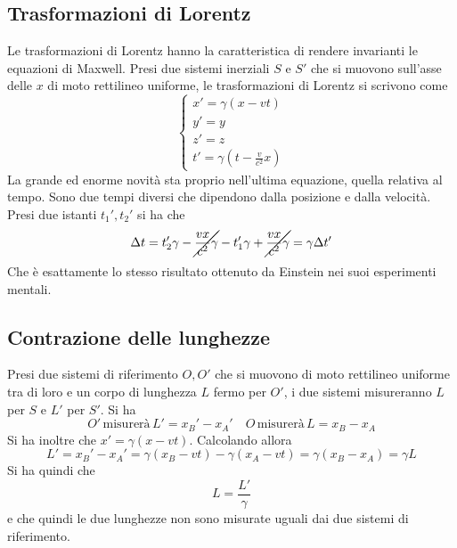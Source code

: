 \subsection{Trasformazioni di Lorentz}
Le trasformazioni di Lorentz hanno la caratteristica di rendere invarianti le equazioni di Maxwell.
Presi due sistemi inerziali $S$ e $S'$ che si muovono sull'asse delle $x$ di moto rettilineo 
uniforme, le trasformazioni di Lorentz si scrivono come
\begin{equation*}
  \begin{cases}
    x'= \gamma(x-vt)\\
    y'=y\\
    z'=z\\
    t'=\gamma(t-\frac{v}{c^2}x)
  \end{cases}
\end{equation*}
La grande ed enorme novità sta proprio nell'ultima equazione, quella relativa al tempo. Sono due 
tempi diversi che dipendono dalla posizione e dalla velocità.\\
Presi due istanti $t_1',t_2'$ si ha che
\begin{equation*}
  \Delta t = t'_2\gamma -\cancel{\frac{vx}{c^2}\gamma}-t'_1\gamma+\cancel{\frac{vx}{c^2}\gamma}=
  \gamma\Delta t'
\end{equation*}
Che è esattamente lo stesso risultato ottenuto da Einstein nei suoi esperimenti mentali.

\subsection{Contrazione delle lunghezze}
Presi due sistemi di riferimento $O,O'$ che si muovono di moto rettilineo uniforme tra di loro e un
corpo di lunghezza $L$ fermo per $O'$, i due sistemi misureranno $L$ per $S$ e $L'$ per $S'$. Si ha
\begin{equation*}
  O'\,\text{misurerà}\,L'= x_B'-x_A'\quad O\,\text{misurerà}\,L=x_B-x_A
\end{equation*}
Si ha inoltre che $x'=\gamma(x-vt)$. Calcolando allora
\begin{equation*}
  L' = x_B'-x_A'=\gamma(x_B-vt)-\gamma(x_A-vt)=\gamma(x_B-x_A)=\gamma L
\end{equation*}
Si ha quindi che
\begin{equation*}
  L = \frac{L'}{\gamma}
\end{equation*}
e che quindi le due lunghezze non sono misurate uguali dai due sistemi di riferimento.

